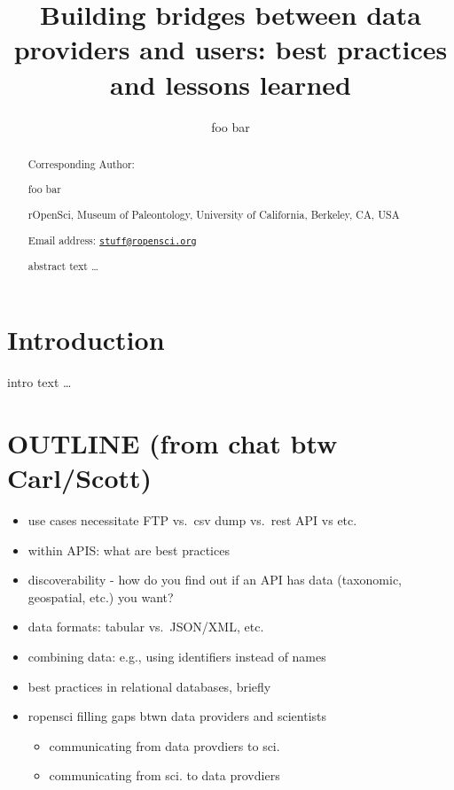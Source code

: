 \documentclass[author-year, review, 11pt]{components/elsarticle} %
\def\tightlist{}
\begin{document}
\begin{frontmatter}

  \title{Building bridges between data providers and users: best practices and
lessons learned}
    \author[cstar]{foo bar}
      \address[cstar]{rOpenSci, Museum of Paleontology, University of California, Berkeley,
CA, USA}
  
  \begin{abstract}
  Corresponding Author:
  
  foo bar
  
  rOpenSci, Museum of Paleontology, University of California, Berkeley,
  CA, USA
  
  Email address:
  \href{mailto:stuff@ropensci.org}{\nolinkurl{stuff@ropensci.org}}
  
  \newpage
  
  abstract text \ldots{}
  \end{abstract}
  
 \end{frontmatter}


\newpage

\hypertarget{introduction}{%
\section{Introduction}\label{introduction}}

intro text \ldots{}

\hypertarget{outline-from-chat-btw-carlscott}{%
\section{OUTLINE (from chat btw
Carl/Scott)}\label{outline-from-chat-btw-carlscott}}

\begin{itemize}
\tightlist
\item
  use cases necessitate FTP vs.~csv dump vs.~rest API vs etc.
\item
  within APIS: what are best practices
\item
  discoverability - how do you find out if an API has data (taxonomic,
  geospatial, etc.) you want?
\item
  data formats: tabular vs.~JSON/XML, etc.
\item
  combining data: e.g., using identifiers instead of names
\item
  best practices in relational databases, briefly
\item
  ropensci filling gaps btwn data providers and scientists

  \begin{itemize}
  \tightlist
  \item
    communicating from data provdiers to sci.
  \item
    communicating from sci. to data provdiers
  \end{itemize}
\end{itemize}
\end{document}
